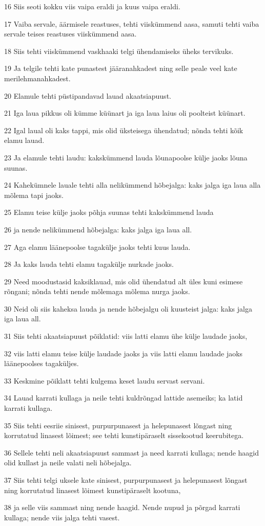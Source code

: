 \par 16 Siis seoti kokku viis vaipa eraldi ja kuus vaipa eraldi.
\par 17 Vaiba servale, äärmisele reastuses, tehti viiskümmend aasa, samuti tehti vaiba servale teises reastuses viiskümmend aasa.
\par 18 Siis tehti viiskümmend vaskhaaki telgi ühendamiseks üheks tervikuks.
\par 19 Ja telgile tehti kate punastest jääranahkadest ning selle peale veel kate merilehmanahkadest.
\par 20 Elamule tehti püstipandavad lauad akaatsiapuust.
\par 21 Iga laua pikkus oli kümme küünart ja iga laua laius oli poolteist küünart.
\par 22 Igal laual oli kaks tappi, mis olid üksteisega ühendatud; nõnda tehti kõik elamu lauad.
\par 23 Ja elamule tehti laudu: kakskümmend lauda lõunapoolse külje jaoks lõuna suunas.
\par 24 Kahekümnele lauale tehti alla nelikümmend hõbejalga: kaks jalga iga laua alla mõlema tapi jaoks.
\par 25 Elamu teise külje jaoks põhja suunas tehti kakskümmend lauda
\par 26 ja nende nelikümmend hõbejalga: kaks jalga iga laua all.
\par 27 Aga elamu läänepoolse tagakülje jaoks tehti kuus lauda.
\par 28 Ja kaks lauda tehti elamu tagakülje nurkade jaoks.
\par 29 Need moodustasid kaksiklauad, mis olid ühendatud alt üles kuni esimese rõngani; nõnda tehti nende mõlemaga mõlema nurga jaoks.
\par 30 Neid oli siis kaheksa lauda ja nende hõbejalgu oli kuusteist jalga: kaks jalga iga laua all.
\par 31 Siis tehti akaatsiapuust põiklatid: viis latti elamu ühe külje laudade jaoks,
\par 32 viis latti elamu teise külje laudade jaoks ja viis latti elamu laudade jaoks läänepoolses tagaküljes.
\par 33 Keskmine põiklatt tehti kulgema keset laudu servast servani.
\par 34 Lauad karrati kullaga ja neile tehti kuldrõngad lattide asemeiks; ka latid karrati kullaga.
\par 35 Siis tehti eesriie sinisest, purpurpunasest ja helepunasest lõngast ning korrutatud linasest lõimest; see tehti kunstipäraselt sissekootud keerubitega.
\par 36 Sellele tehti neli akaatsiapuust sammast ja need karrati kullaga; nende haagid olid kullast ja neile valati neli hõbejalga.
\par 37 Siis tehti telgi uksele kate sinisest, purpurpunasest ja helepunasest lõngast ning korrutatud linasest lõimest kunstipäraselt kootuna,
\par 38 ja selle viis sammast ning nende haagid. Nende nupud ja põrgad karrati kullaga; nende viis jalga tehti vasest.


